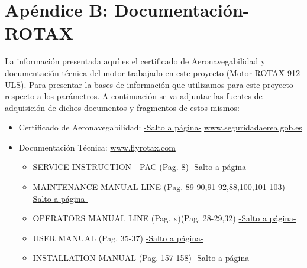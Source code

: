 \chapter{Apéndice B: Documentación-ROTAX}
    La información presentada aquí es el certificado de Aeronavegabilidad y documentación técnica del motor trabajado en este proyecto (Motor ROTAX 912 ULS). Para presentar la bases de información que utilizamos para este proyecto respecto a los parámetros. A continuación se va adjuntar las fuentes de adquisición de dichos documentos y fragmentos de estos mismos:
    
\begin{itemize}
    \item Certificado de Aeronavegabilidad: 
    \hyperlink{certificado-aeronavegabilidad}{-Salto a página-}
    \href{https://www.seguridadaerea.gob.es/sites/default/files/HD%20TC286-I%20r8.pdf}{www.seguridadaerea.gob.es}
    \hfill
    
    \item Documentación Técnica:
    \href{https://www.flyrotax.com/p/service/technical-documentation}{www.flyrotax.com} 

    \begin{itemize}
        \item SERVICE INSTRUCTION - PAC (Pag. 8) 
        \hyperlink{service-instruction-pag8}{-Salto a página-} %
    \end{itemize}

    \begin{itemize}
        \item MAINTENANCE MANUAL LINE (Pag. 89-90,91-92,88,100,101-103)
        \hyperlink{maintenance-manual-pag91-92}{-Salto a página-} %
    \end{itemize}

    \begin{itemize}
        \item OPERATORS MANUAL LINE (Pag. x)(Pag. 28-29,32)
        \hyperlink{operators-manual1}{-Salto a página-} 
    \end{itemize}

    \begin{itemize}
        \item USER MANUAL (Pag. 35-37) 
        \hyperlink{user-manual}{-Salto a página-} 
    \end{itemize}

    \begin{itemize}
        \item INSTALLATION MANUAL (Pag. 157-158) 
        \hyperlink{manual de instalacion}{-Salto a página-} 
    \end{itemize}
\end{itemize}

